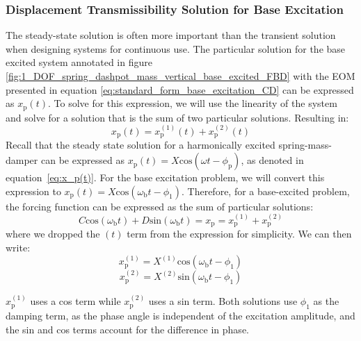 \documentclass[12pt,letter]{article}
\begin{document}
 \subsubsection{Displacement Transmissibility Solution for Base Excitation}
  The steady-state solution is often more important than the transient solution when designing systems for continuous use. The particular solution for the base excited system annotated in figure \ref{fig:1_DOF_spring_dashpot_mass_vertical_base_excited_FBD} with the EOM presented in equation \ref{eq:standard_form_base_excitation_CD} can be expressed as $ x_\text{p}(t)$. To solve for this expression, we will use the linearity of the system and solve for a solution that is the sum of two particular solutions. Resulting in:
  \begin{equation}
 x_\text{p}(t) =  x_\text{p}^{(1)}(t) +  x_\text{p}^{(2)}(t)  
  \end{equation}
 Recall that the steady state solution for a harmonically excited spring-mass-damper can be expressed as $x_\text{p}(t) = X\text{cos}(\omega t - \phi_\text{p})$, as denoted in equation~\ref{eq:x_p(t)}. For the base excitation problem, we will convert this expression to $x_\text{p}(t) = X\text{cos}(\omega_\text{b} t - \phi_1)$. Therefore, for a base-excited problem, the forcing function can be expressed as the sum of particular solutions:
  \begin{equation}
   C \text{cos}(\omega_\text{b} t)  + D \text{sin}(\omega_\text{b} t)   = x_\text{p} =  x_\text{p}^{(1)} +  x_\text{p}^{(2)} 
  \end{equation}
  where we dropped the $(t)$ term from the expression for simplicity. We can then write:
  \begin{equation}
   x_\text{p}^{(1)} = X^{(1)}\text{cos}(\omega_\text{b} t - \phi_1)
  \end{equation}
  \begin{equation}
   x_\text{p}^{(2)} = X^{(2)} \text{sin}(\omega_\text{b} t - \phi_1)
  \end{equation}
 
  \begin{note}
  $x_\text{p}^{(1)}$ uses a cos term while $x_\text{p}^{(2)}$ uses a sin term. Both solutions use $\phi_1$ as the damping term, as the phase angle is independent of the excitation amplitude, and the sin and cos terms account for the difference in phase. 
  \end{note}
\end{document}
